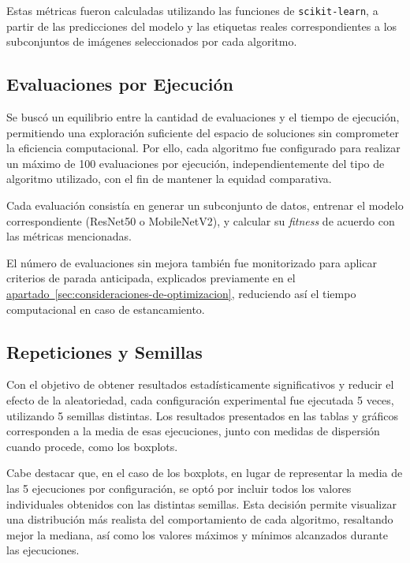Estas métricas fueron calculadas utilizando las funciones de \texttt{scikit-learn}, a partir de las predicciones del modelo y las etiquetas
reales correspondientes a los subconjuntos de imágenes seleccionados por cada algoritmo.

\subsection{Evaluaciones por Ejecución}\label{sec:evaluaciones-por-ejecucion}
Se buscó un equilibrio entre la cantidad de evaluaciones y el tiempo de ejecución, permitiendo una exploración suficiente del espacio de soluciones sin comprometer la eficiencia computacional.
Por ello, cada algoritmo fue configurado para realizar un máximo de 100 evaluaciones por ejecución,
independientemente del tipo de algoritmo utilizado, con el fin de mantener la equidad comparativa.

Cada evaluación consistía en generar un subconjunto de datos, entrenar el modelo correspondiente (ResNet50 o MobileNetV2),
y calcular su \textit{fitness} de acuerdo con las métricas mencionadas.

El número de evaluaciones sin mejora también fue monitorizado para aplicar criterios de parada anticipada,
explicados previamente en el \hyperref[sec:consideraciones-de-optimizacion]{apartado~\ref*{sec:consideraciones-de-optimizacion}},
reduciendo así el tiempo computacional en caso de estancamiento.

\subsection{Repeticiones y Semillas}\label{sec:repeticiones-y-semillas}
Con el objetivo de obtener resultados estadísticamente significativos y reducir el efecto de la aleatoriedad,
cada configuración experimental fue ejecutada 5 veces, utilizando 5 semillas distintas.
Los resultados presentados en las tablas y gráficos corresponden a la media de esas ejecuciones,
junto con medidas de dispersión cuando procede, como los boxplots.

Cabe destacar que, en el caso de los boxplots, en lugar de representar la media de las 5 ejecuciones por configuración, 
se optó por incluir todos los valores individuales obtenidos con las distintas semillas. 
Esta decisión permite visualizar una distribución más realista del comportamiento de cada algoritmo, 
resaltando mejor la mediana, así como los valores máximos y mínimos alcanzados durante las ejecuciones.


